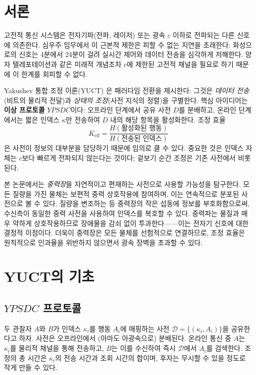 \documentclass[12pt,a4paper]{article}
\newcommand{\Keff}{K_{\mathrm{eff}}}
\newcommand{\YPSDC}{YPSDC}
\begin{document}
	\tableofcontents
	\newpage
	
	\section{서론}
	\label{sec:intro}
	
	고전적 통신 시스템은 전자기파(전파, 레이저) 또는 광속 \(c\) 이하로 전파되는 다른 신호에 의존한다. 심우주 임무에서 이 근본적 제한은 피할 수 없는 지연을 초래한다: 화성으로의 신호는 4분에서 24분이 걸려 실시간 제어와 데이터 전송을 심각하게 저해한다. 양자 텔레포테이션과 같은 미래적 개념조차 \(c\)에 제한된 고전적 채널을 필요로 하기 때문에 이 한계를 회피할 수 없다.
	
	Yakushev 통합 조정 이론(YUCT) \cite{Yakushev2026}은 패러다임 전환을 제시한다: 그것은 \emph{데이터 전송}(비트의 물리적 전달)과 \emph{상태의 조정}(사전 지식의 정렬)을 구별한다. 핵심 아이디어는 \textbf{이상 프로토콜} \(\YPSDC\)이다: 오프라인 단계에서 공유 사전 \(D\)를 분배하고, 온라인 단계에서는 짧은 인덱스 \(\kappa\)만 전송하여 \(D\) 내의 해당 항목을 활성화한다. 조정 효율
	\begin{equation}
		\Keff = \frac{H(\text{활성화된 행동})}{H(\text{전송된 인덱스})}
	\end{equation}
	은 사전이 정보의 대부분을 담당하기 때문에 임의로 클 수 있다. 중요한 것은 인덱스 자체는 \(c\)보다 빠르게 전파되지 않는다는 것이다; 겉보기 순간 조정은 기존 사전에서 비롯된다.
	
	본 논문에서는 \emph{중력장}을 자연적이고 편재하는 사전으로 사용할 가능성을 탐구한다. 모든 질량을 가진 물체는 보편적 중력 상호작용에 참여하며, 이는 연속적으로 분포된 사전으로 볼 수 있다. 질량을 변조하는 등 중력장의 작은 섭동에 정보를 부호화함으로써, 수신측이 동일한 중력 사전을 사용하여 인덱스를 복호할 수 있다. 중력파는 물질과 매우 약하게 상호작용하므로 장애물을 감쇠 없이 투과한다——이는 전자기 신호에 대한 결정적 이점이다. 더욱이 중력장은 모든 물체를 선험적으로 연결하므로, 조정 효율은 원칙적으로 인과율을 위반하지 않으면서 광속 장벽을 초과할 수 있다.
	
	\section{YUCT의 기초}
	\label{sec:foundations}
	
	\subsection{\(\YPSDC\) 프로토콜}
	\label{subsec:ypsdc}
	
	두 관찰자 \(A\)와 \(B\)가 인덱스 \(\kappa_i\)를 행동 \(A_i\)에 매핑하는 사전 \(\mathcal{D} = \{ (\kappa_i, A_i) \}\)을 공유한다고 하자. 사전은 오프라인에서 (아마도 아광속으로) 분배된다. 온라인 통신 중 \(A\)는 \(\kappa_i\)를 물리적 채널을 통해 전송하고, \(B\)는 이를 수신하여 즉시 \(\mathcal{D}\)에서 \(A_i\)를 검색한다. 조정의 총 시간은 \(\kappa_i\)의 전송 시간과 조회 시간의 합이며, 후자는 무시할 수 있을 정도로 작게 만들 수 있다.
	
\end{document}
